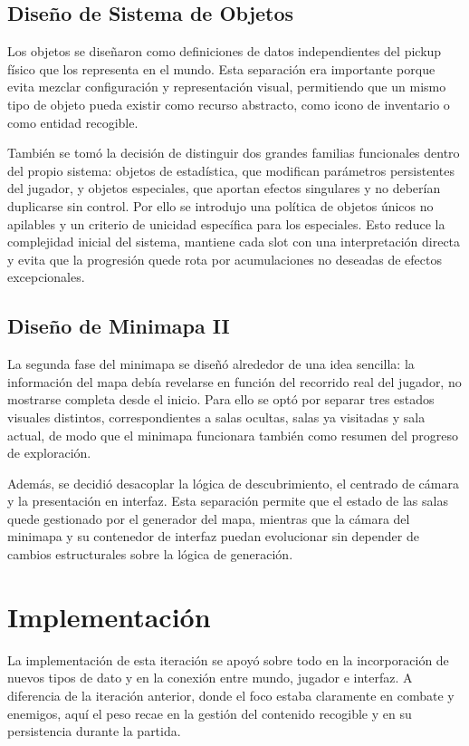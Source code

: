 \subsection{Diseño de Sistema de Objetos}
Los objetos se diseñaron como definiciones de datos independientes del pickup físico que los
representa en el mundo. Esta separación era importante porque evita mezclar configuración y
representación visual, permitiendo que un mismo tipo de objeto pueda existir como recurso
abstracto, como icono de inventario o como entidad recogible.

También se tomó la decisión de distinguir dos grandes familias funcionales dentro del propio
sistema: objetos de estadística, que modifican parámetros persistentes del jugador, y objetos
especiales, que aportan efectos singulares y no deberían duplicarse sin control. Por ello se
introdujo una política de objetos únicos no apilables y un criterio de unicidad específica
para los especiales. Esto reduce la complejidad inicial del sistema, mantiene cada slot con
una interpretación directa y evita que la progresión quede rota por acumulaciones no deseadas
de efectos excepcionales.

\subsection{Diseño de Minimapa II}
La segunda fase del minimapa se diseñó alrededor de una idea sencilla: la información del
mapa debía revelarse en función del recorrido real del jugador, no mostrarse completa desde
el inicio. Para ello se optó por separar tres estados visuales distintos, correspondientes a
salas ocultas, salas ya visitadas y sala actual, de modo que el minimapa funcionara también
como resumen del progreso de exploración.

Además, se decidió desacoplar la lógica de descubrimiento, el centrado de cámara y la
presentación en interfaz. Esta separación permite que el estado de las salas quede
gestionado por el generador del mapa, mientras que la cámara del minimapa y su contenedor de
interfaz puedan evolucionar sin depender de cambios estructurales sobre la lógica de
generación.

\section{Implementación}
La implementación de esta iteración se apoyó sobre todo en la incorporación de nuevos tipos
de dato y en la conexión entre mundo, jugador e interfaz. A diferencia de la iteración
anterior, donde el foco estaba claramente en combate y enemigos, aquí el peso recae en la
gestión del contenido recogible y en su persistencia durante la partida.

